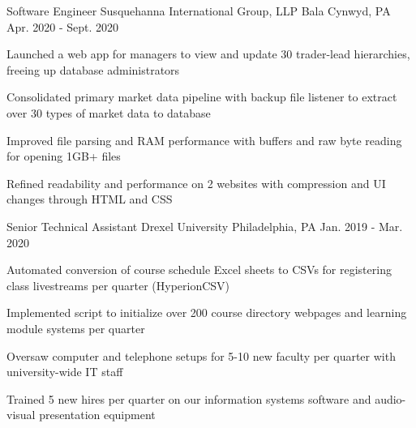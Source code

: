 

\begin{cventries}

  \cventry
  {Software Engineer} %
  {Susquehanna International Group, LLP} %
  {Bala Cynwyd, PA} %
  {Apr. 2020 - Sept. 2020} %
  {
    \begin{cvitems} %
      \item {Launched a web app for managers to view and update 30 trader-lead hierarchies, freeing up database administrators}
      \item {Consolidated primary market data pipeline with backup file listener to extract over 30 types of market data to database}
      \item {Improved file parsing and RAM performance with buffers and raw byte reading for opening 1GB+ files}
      \item {Refined readability and performance on 2 websites with compression and UI changes through HTML and CSS}
    \end{cvitems}
  }

  \cventry
  {Senior Technical Assistant} %
  {Drexel University} %
  {Philadelphia, PA} %
  {Jan. 2019 - Mar. 2020} %
  {
    \begin{cvitems} %
      \item {Automated conversion of course schedule Excel sheets to CSVs for registering class livestreams per quarter (HyperionCSV)}
      \item {Implemented script to initialize over 200 course directory webpages and learning module systems per quarter}
      \item {Oversaw computer and telephone setups for 5-10 new faculty per quarter with university-wide IT staff}
      \item {Trained 5 new hires per quarter on our information systems software and audio-visual presentation equipment}
    \end{cvitems}
  }

\end{cventries}
